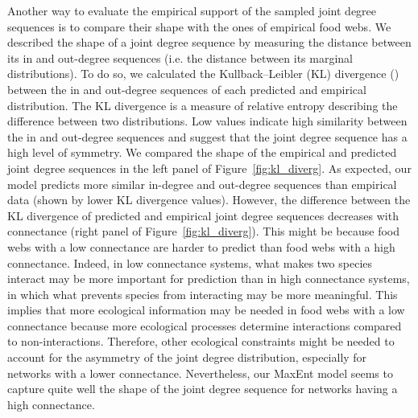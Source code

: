 Another way to evaluate the empirical support of the sampled joint degree
sequences is to compare their shape with the ones of empirical food webs. We
described the shape of a joint degree sequence by measuring the distance between
its in and out-degree sequences (i.e. the distance between its marginal
distributions). To do so, we calculated the Kullback–Leibler (KL) divergence
(\cite{Kullback1951Information}) between the in and out-degree sequences of each
predicted and empirical distribution. The KL divergence is a measure of relative
entropy describing the difference between two distributions. Low values indicate
high similarity between the in and out-degree sequences and suggest that the
joint degree sequence has a high level of symmetry. We compared the shape of the
empirical and predicted joint degree sequences in the left panel of
Figure~\ref{fig:kl_diverg}. As expected, our model predicts more similar in-degree and
out-degree sequences than empirical data (shown by lower KL divergence values).
However, the difference between the KL divergence of predicted and empirical
joint degree sequences decreases with connectance (right panel of
Figure~\ref{fig:kl_diverg}). This might be because food webs with a low connectance are
harder to predict than food webs with a high connectance. Indeed, in low
connectance systems, what makes two species interact may be more important for
prediction than in high connectance systems, in which what prevents species from
interacting may be more meaningful. This implies that more ecological
information may be needed in food webs with a low connectance because more
ecological processes determine interactions compared to non-interactions.
Therefore, other ecological constraints might be needed to account for the
asymmetry of the joint degree distribution, especially for networks with a lower
connectance. Nevertheless, our MaxEnt model seems to capture quite well the
shape of the joint degree sequence for networks having a high connectance.

